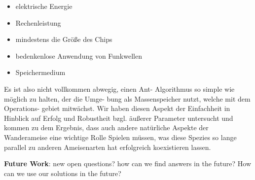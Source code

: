 \begin{itemize}
\tightlist
\item
  elektrische Energie
\item
  Rechenleistung
\item
  mindestens die Größe des Chips
\item
  bedenkenlose Anwendung von Funkwellen
\item
  Speichermedium
\end{itemize}

Es ist also nicht vollkommen abwegig, einen Ant- Algorithmus so simple
wie möglich zu halten, der die Umge- bung als Massenspeicher nutzt,
welche mit dem Operations- gebiet mitwächst. Wir haben diesen Aspekt der
Einfachheit in Hinblick auf Erfolg und Robustheit bzgl. äußerer
Parameter untersucht und kommen zu dem Ergebnis, dass auch andere
natürliche Aspekte der Wanderameise eine wichtige Rolle Spielen müssen,
was diese Spezies so lange parallel zu anderen Ameisenarten hat
erfolgreich koexistieren lassen.

\textbf{Future Work}: new open questions? how can we find answers in the
future? How can we use our solutions in the future?
